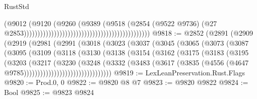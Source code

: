 \begin{lexlean}{RustStd}
\begin{coremodule}
                                                                                  (@9012
                                                                                    (@9120
                                                                                      (@9260
                                                                                        (@9389
                                                                                          (@9518
                                                                                            (@2854
                                                                                              (@9522
                                                                                                @9736)
                                                                                              (@27
                                                                                                @2853))))))))))))))))))))))))))))))))))))))))))))))
@9818 := @2852
    (@2891
      (@2909
        (@2919
          (@2981
            (@2991
              (@3018
                (@3023
                  (@3037
                    (@3045
                      (@3065
                        (@3073
                          (@3087
                            (@3095
                              (@3109
                                (@3118
                                  (@3130
                                    (@3138
                                      (@3154
                                        (@3162
                                          (@3175
                                            (@3183
                                              (@3195
                                                (@3203
                                                  (@3217
                                                    (@3230
                                                      (@3248
                                                        (@3332
                                                          (@3483
                                                            (@3617
                                                              (@3835
                                                                (@4556
                                                                  (@4647
                                                                    @9785))))))))))))))))))))))))))))))))
@9819 := LexLeanPreservation.Rust.Flags
@9820 := Prod.{0, 0}
@9822 := @9820 @8 @7
@9823 := @9820 @9822
@9824 := Bool
@9825 := @9823 @9824

\end{coremodule}
\end{lexlean}
